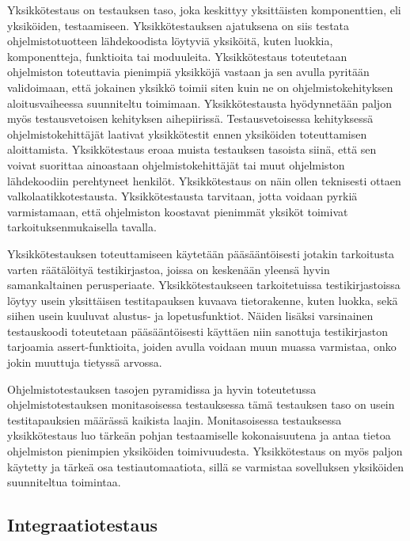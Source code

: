     Yksikkötestaus on testauksen taso, joka keskittyy yksittäisten komponenttien, eli yksiköiden, testaamiseen.
    Yksikkötestauksen ajatuksena on siis testata ohjelmistotuotteen lähdekoodista löytyviä yksiköitä, kuten luokkia, komponentteja, funktioita tai moduuleita.
    Yksikkötestaus toteutetaan ohjelmiston toteuttavia pienimpiä yksikköjä vastaan ja sen avulla pyritään validoimaan, että jokainen yksikkö toimii siten kuin ne on ohjelmistokehityksen aloitusvaiheessa suunniteltu toimimaan.
    Yksikkötestausta hyödynnetään paljon myös testausvetoisen kehityksen aihepiirissä.
    Testausvetoisessa kehityksessä ohjelmistokehittäjät laativat yksikkötestit ennen yksiköiden toteuttamisen aloittamista.
    Yksikkötestaus eroaa muista testauksen tasoista siinä, että sen voivat suorittaa ainoastaan ohjelmistokehittäjät tai muut ohjelmiston lähdekoodiin perehtyneet henkilöt.
    Yksikkötestaus on näin ollen teknisesti ottaen valkolaatikkotestausta.
    Yksikkötestausta tarvitaan, jotta voidaan pyrkiä varmistamaan, että ohjelmiston koostavat pienimmät yksiköt toimivat tarkoituksenmukaisella tavalla. \cite{istqb_glossary_v3_3} \cite{testing_levels_webpage}

    Yksikkötestauksen toteuttamiseen käytetään pääsääntöisesti jotakin tarkoitusta varten räätälöityä testikirjastoa, joissa on keskenään yleensä hyvin samankaltainen perusperiaate.
    Yksikkötestaukseen tarkoitetuissa testikirjastoissa löytyy usein yksittäisen testitapauksen kuvaava tietorakenne, kuten luokka, sekä siihen usein kuuluvat alustus- ja lopetusfunktiot.
    Näiden lisäksi varsinainen testauskoodi toteutetaan pääsääntöisesti käyttäen niin sanottuja testikirjaston tarjoamia assert-funktioita, joiden avulla voidaan muun muassa varmistaa, onko jokin muuttuja tietyssä arvossa.

    Ohjelmistotestauksen tasojen pyramidissa ja hyvin toteutetussa ohjelmistotestauksen monitasoisessa testauksessa tämä testauksen taso on usein testitapauksien määrässä kaikista laajin.
    Monitasoisessa testauksessa yksikkötestaus luo tärkeän pohjan testaamiselle kokonaisuutena ja antaa tietoa ohjelmiston pienimpien yksiköiden toimivuudesta.
    Yksikkötestaus on myös paljon käytetty ja tärkeä osa testiautomaatiota, sillä se varmistaa sovelluksen yksiköiden suunniteltua toimintaa.

  \subsection{Integraatiotestaus} \label{ch:07_integraatiotestaus}

